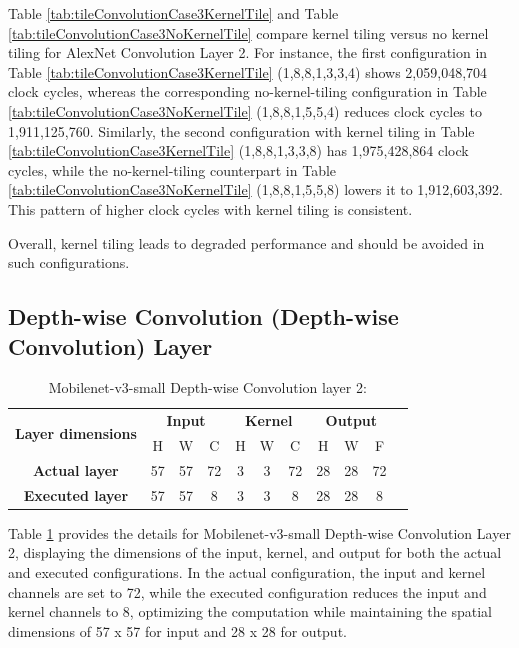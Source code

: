 Table \ref{tab:tileConvolutionCase3KernelTile} and Table \ref{tab:tileConvolutionCase3NoKernelTile} compare kernel tiling versus no kernel tiling for AlexNet Convolution Layer 2. For instance, the first configuration in Table \ref{tab:tileConvolutionCase3KernelTile} (1,8,8,1,3,3,4) shows 2,059,048,704 clock cycles, whereas the corresponding no-kernel-tiling configuration in Table \ref{tab:tileConvolutionCase3NoKernelTile} (1,8,8,1,5,5,4) reduces clock cycles to 1,911,125,760. Similarly, the second configuration with kernel tiling in Table \ref{tab:tileConvolutionCase3KernelTile} (1,8,8,1,3,3,8) has 1,975,428,864 clock cycles, while the no-kernel-tiling counterpart in Table \ref{tab:tileConvolutionCase3NoKernelTile} (1,8,8,1,5,5,8) lowers it to 1,912,603,392. This pattern of higher clock cycles with kernel tiling is consistent.

Overall, kernel tiling leads to degraded performance and should be avoided in such configurations.

\subsection{Depth-wise Convolution (Depth-wise Convolution) Layer}

\begin{table}[H]
\centering
\caption{Mobilenet-v3-small Depth-wise Convolution layer 2:}
\label{tab:tileDConvolutionDim}
 \begin{tabular}{|c|c|c|c|c|c|c|c|c|c|c|} \hline  
 
 \multirow{2}{*}{\textbf{Layer dimensions}} &  
 \multicolumn{3}{|c|}{\textbf{Input}} &  
 \multicolumn{3}{|c|}{\textbf{Kernel}} &  
 \multicolumn{3}{|c|}{\textbf{Output}}\\ \cline{2-10}
 & H &  W &  C&  H &  W &  C &  H &  W & F\\ \hline  
 \textbf{Actual layer} &  57 &  57 & 72 & 3 & 3 & 72 & 28 & 28 & 72\\ \hline 
 \textbf{Executed layer} &  57 &  57 &  \cellcolor{yellow}8 & 3 & 3 & \cellcolor{yellow}8 & 28 & 28 & \cellcolor{yellow}8 \\ \hline 
 \end{tabular}
\end{table}

Table \ref{tab:tileDConvolutionDim} provides the details for Mobilenet-v3-small Depth-wise Convolution Layer 2, displaying the dimensions of the input, kernel, and output for both the actual and executed configurations. In the actual configuration, the input and kernel channels are set to 72, while the executed configuration reduces the input and kernel channels to 8, optimizing the computation while maintaining the spatial dimensions of 57 x 57 for input and 28 x 28 for output.

